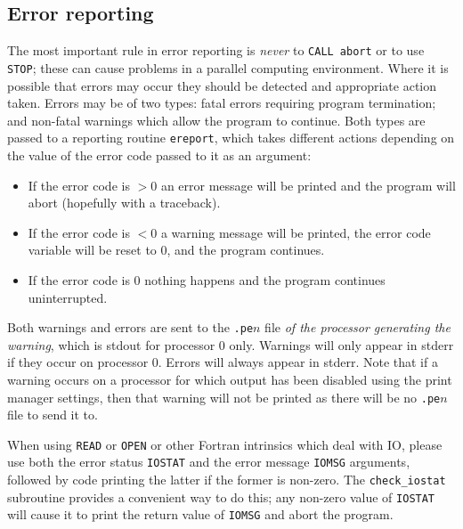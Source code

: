 \subsection{Error reporting}\label{Error reporting}

The most important rule in error reporting is \emph{never} to \verb|CALL abort|
or to use \verb|STOP|;
these can cause problems in a parallel computing environment.
Where it is possible that errors may occur they should be detected and
appropriate action taken.
Errors may be of two types: fatal errors requiring program termination;
and non-fatal warnings which allow the program to continue.
Both types are passed to a reporting routine \verb|ereport|, which takes
different actions depending on the value of the error code passed to it as an
argument:
\begin{itemize}
 \item If the error code is $> 0$ an error message will be printed and the
program will abort (hopefully with a traceback).
 \item If the error code is $< 0$ a warning message will be printed, the
error code variable will be reset to 0, and the program continues.
 \item If the error code is 0 nothing happens and the program continues
uninterrupted.
\end{itemize}

Both warnings and errors are sent to the \verb|.pe|$n$ file \emph{of the
processor generating the warning}, which is stdout for processor 0 only.
Warnings will only appear in stderr if they occur on processor 0. Errors will
always appear in stderr. Note that if a warning occurs on a processor for which
output has been disabled using the print manager settings, then that warning
will not be printed as there will be no \verb|.pe|$n$ file to send it to.

When using \verb|READ| or \verb|OPEN| or other Fortran intrinsics which deal
with IO, please use both the error status \verb|IOSTAT| and the error
message \verb|IOMSG| arguments, followed by code printing the latter if the
former is non-zero. The \verb|check_iostat| subroutine provides a convenient way
to do this; any non-zero value of \verb|IOSTAT| will cause it to print the
return value of \verb|IOMSG| and abort the program.

